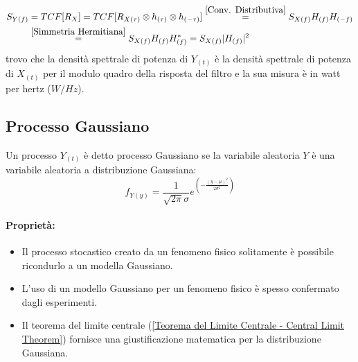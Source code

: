            \begin{align}
                S_{Y(f)} &= TCF[R_X] =TCF[ R_{X(\tau)}\otimes h_{(\tau)} \otimes h_{(-\tau)}] \overset{\ref{Conv. Distributiva}}{=}  S_{X(f)}H_{(f)} H_{(-f)}    \nonumber \\
                         &\overset{\ref{Simmetria Hermitiana}}{=} S_{X(f)}H_{(f)} H^\ast_{(f)} =  S_{X(f)}|H_{(f)}|^2\nonumber
            \end{align}
            trovo che la densità spettrale di potenza di $Y_{(t)}$ è la densità spettrale di potenza di $X_{(t)}$ per il modulo quadro della
            risposta del filtro e la sua misura è in watt per hertz ($W/Hz$).
    \subsection{Processo Gaussiano}
        Un processo $Y_{(t)}$ è detto processo Gaussiano se la variabile aleatoria $Y$ è una variabile aleatoria a distribuzione Gaussiana:
        \[
            f_{Y(y)} = \frac{1}{\sqrt{2\pi}\sigma}e^{\left(\displaystyle-\frac{(y-\mu)^2}{2\sigma^2}\right)}    
        \] 
        \paragraph{Proprietà:}
        \begin{itemize}
            \item {
                Il processo stocastico creato da un fenomeno fisico solitamente è possibile ricondurlo a un modella Gaussiano.
            }
            \item {
                L'uso di un modello Gaussiano per un fenomeno fisico è spesso confermato dagli esperimenti.
            }
            \item {
                Il teorema del limite centrale (\ref{Teorema del Limite Centrale - Central Limit Theorem}) fornisce una giustificazione matematica per la 
                distribuzione Gaussiana.
            }
        \end{itemize}
